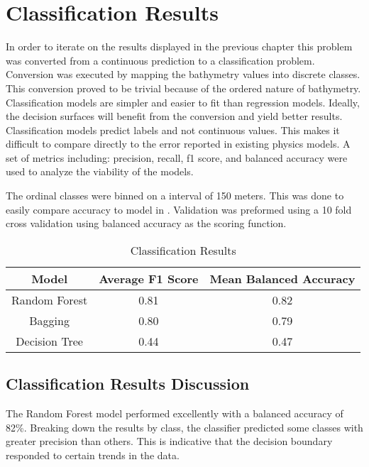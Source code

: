 \section{Classification Results}
\setlength{\parindent}{10ex}
In order to iterate on the results displayed in the previous chapter this problem was converted from a continuous prediction to a classification problem.
Conversion was executed by mapping the bathymetry values into discrete classes.
This conversion proved to be trivial because of the ordered nature of bathymetry.
Classification models are simpler and easier to fit than regression models.
Ideally, the decision surfaces will benefit from the conversion and yield better results.
Classification models predict labels and not continuous values.
This makes it difficult to compare directly to the error reported in existing physics models.
A set of metrics including: precision, recall, f1 score, and balanced accuracy were used to analyze the viability of the models.

\par
The ordinal classes were binned on a interval of 150 meters.
This was done to easily compare accuracy to model in \cite{jena2012prediction}.
Validation was preformed using a 10 fold cross validation using balanced accuracy as the scoring function.

\begin{table}[htp]
    \centering
    \begin{tabular}{|c c c|}
        \hline
		\textbf{Model} & \textbf{Average F1 Score} & \textbf{Mean Balanced Accuracy} \\
		\hline
		Random Forest & 0.81 & 0.82 \\
        Bagging & 0.80 & 0.79 \\
        Decision Tree & 0.44 & 0.47 \\
        \hline
    \end{tabular}
    \label{table:CLASSIFICATION_RESULTS}
    \caption{Classification Results}
\end{table}

\subsection{Classification Results Discussion}
The Random Forest model performed excellently with a balanced accuracy of 82\%.
Breaking down the results by class, the classifier predicted some classes with greater precision than others.
This is indicative that the decision boundary responded to certain trends in the data.

